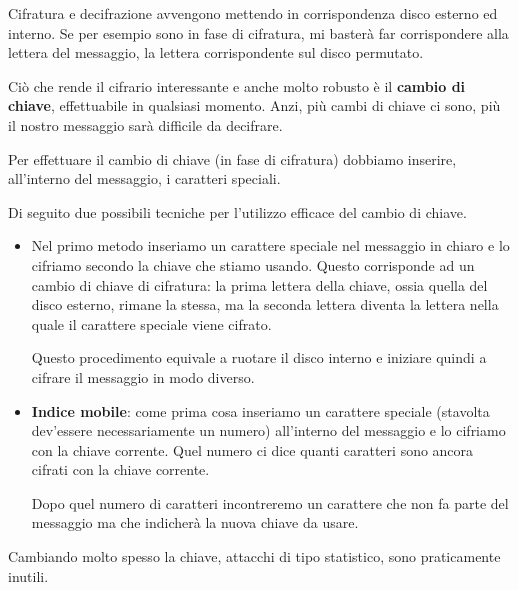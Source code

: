 Cifratura e decifrazione avvengono mettendo in corrispondenza disco esterno ed interno. Se per esempio sono in fase di
cifratura, mi baster\`a far corrispondere alla lettera del messaggio, la lettera corrispondente sul disco permutato.

Ci\`o che rende il cifrario interessante e anche molto robusto \`e il \textbf{cambio di chiave}, effettuabile in
qualsiasi momento. Anzi, pi\`u cambi di chiave ci sono, pi\`u il nostro messaggio sar\`a difficile da decifrare.

Per effettuare il cambio di chiave (in fase di cifratura) dobbiamo inserire, all'interno del messaggio, i caratteri
speciali.

Di seguito due possibili tecniche per l'utilizzo efficace del cambio di chiave.
\begin{itemize}
	\item Nel primo metodo inseriamo un carattere speciale nel messaggio in chiaro e lo cifriamo secondo la chiave che
	      stiamo usando. Questo corrisponde ad un cambio di chiave di cifratura: la prima lettera della chiave, ossia
	      quella del disco esterno, rimane la stessa, ma la seconda lettera diventa la lettera nella quale il carattere
	      speciale viene cifrato.

	      Questo procedimento equivale a ruotare il disco interno e iniziare quindi a cifrare il messaggio in modo
	      diverso.
	\item \textbf{Indice mobile}: come prima cosa inseriamo un carattere speciale (stavolta dev'essere necessariamente
	      un numero) all'interno del messaggio e lo cifriamo con la chiave corrente. Quel numero ci dice quanti
	      caratteri sono ancora cifrati con la chiave corrente.

	      Dopo quel numero di caratteri incontreremo un carattere che non fa parte del messaggio ma che indicher\`a la
	      nuova chiave da usare.
\end{itemize}
Cambiando molto spesso la chiave, attacchi di tipo statistico, sono praticamente inutili.

